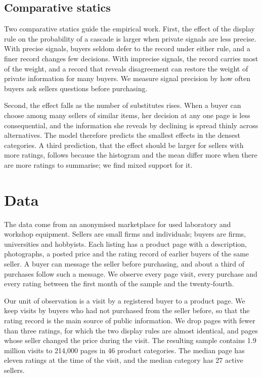 \documentclass[12pt]{article}
\begin{document}
\subsection{Comparative statics}
Two comparative statics guide the empirical work. First, the effect of the display rule on the probability of a cascade is larger when private signals are less precise. With precise signals, buyers seldom defer to the record under either rule, and a finer record changes few decisions. With imprecise signals, the record carries most of the weight, and a record that reveals disagreement can restore the weight of private information for many buyers. We measure signal precision by how often buyers ask sellers questions before purchasing.

Second, the effect falls as the number of substitutes rises. When a buyer can choose among many sellers of similar items, her decision at any one page is less consequential, and the information she reveals by declining is spread thinly across alternatives. The model therefore predicts the smallest effects in the densest categories. A third prediction, that the effect should be larger for sellers with more ratings, follows because the histogram and the mean differ more when there are more ratings to summarise; we find mixed support for it.

\section{Data}
The data come from an anonymised marketplace for used laboratory and workshop equipment. Sellers are small firms and individuals; buyers are firms, universities and hobbyists. Each listing has a product page with a description, photographs, a posted price and the rating record of earlier buyers of the same seller. A buyer can message the seller before purchasing, and about a third of purchases follow such a message. We observe every page visit, every purchase and every rating between the first month of the sample and the twenty-fourth.

Our unit of observation is a visit by a registered buyer to a product page. We keep visits by buyers who had not purchased from the seller before, so that the rating record is the main source of public information. We drop pages with fewer than three ratings, for which the two display rules are almost identical, and pages whose seller changed the price during the visit. The resulting sample contains 1.9 million visits to 214,000 pages in 46 product categories. The median page has eleven ratings at the time of the visit, and the median category has 27 active sellers.
\end{document}
